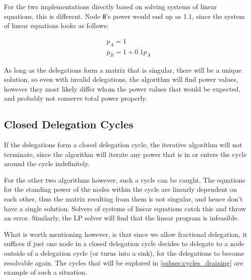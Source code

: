 For the two implementations directly based on solving systems of linear equations, this is different. Node \texttt{B}'s power would end up as 1.1, since the system of linear equations looks as follows:

\begin{align*}
& p_A = 1 \\
& p_B = 1 + 0.1p_A
\end{align*}

As long as the delegations form a matrix that is singular, there will be a unique solution, so even with invalid delegations, the algorithm will find power values, however they most likely differ whom the power values that would be expected, and probably not conserve total power properly. 

\subsection{Closed Delegation Cycles}

If the delegations form a closed delegation cycle, the iterative algorithm will not terminate, since the algorithm will iterate any power that is in or enters the cycle around the cycle indefinitely. 

For the other two algorithms however, such a cycle can be caught. The equations for the standing power of the nodes within the cycle are linearly dependent on each other, thus the matrix resulting from them is not singular, and hence don't have a single solution. Solvers of systems of linear equations catch this and throw an error. Similarly, the LP solver will find that the linear program is infeasible.

What is worth mentioning however, is that since we allow fractional delegation, it suffices if just one node in a closed delegation cycle decides to delegate to a node outside of a delegation cycle (or turns into a sink), for the delegations to become resolvable again. The cycles that will be explored in \cref{subsec:cycles_draining} are example of such a situation. 
